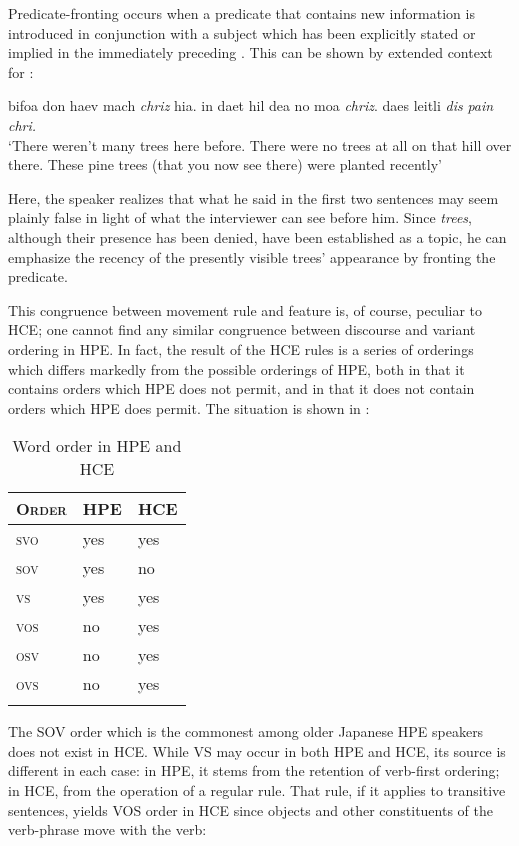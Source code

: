 Predicate-fronting occurs when a predicate that contains new information is introduced in conjunction with a subject which has been explicitly stated or implied in the immediately preceding . This can be shown by extended context for :

\ea\label{ex:26}
 bifoa don haev mach \textit{chriz} hia. in daet hil dea no moa \textit{chriz}. daes leitli \textit{dis} \textit{pain} \textit{chri.} \\
\glt  `There weren't many trees here before. There were no trees
at all on that hill over there. These pine trees (that you now see there) were planted recently'
\z

\noindent Here, the speaker realizes that what he said in the first two sentences may seem plainly false in light of what the interviewer can see before him. Since \textit{trees}, although their presence has been denied, have been established as a topic, he can emphasize the recency of the presently visible trees' appearance by fronting the predicate.

This congruence between movement rule and  feature is, of course, peculiar to HCE; one cannot find any similar congruence between discourse and variant ordering in HPE. In fact, the result of the HCE rules is a series of orderings which differs markedly from the possible orderings of HPE, both in that it contains orders which HPE does not permit, and in that it does not contain orders which HPE does permit. The situation is shown in :


\begin{table}
\begin{tabular}{>{\scshape}lll}
\lsptoprule
\rm Order & HPE & HCE\\
\midrule
svo  & yes &  yes\\
sov  & yes  &  no\\
vs  & yes  & yes\\
vos  & no & yes\\
osv  & no &  yes\\
ovs  & no &  yes\\
\lspbottomrule
\end{tabular}
\caption{Word order in HPE and HCE}
\label{tab:1.1}
\end{table}

The SOV order which is the commonest among older Japanese HPE speakers does not exist in HCE. While VS may occur in both HPE and HCE, its source is different in each case: in HPE, it stems from the retention of verb-first ordering; in HCE, from the operation of a regular rule. That rule, if it applies to transitive sentences, yields VOS order in HCE since objects and other constituents of the verb-phrase move
with the verb:

